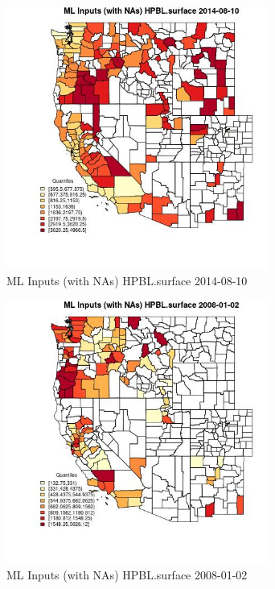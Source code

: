 \begin{figure} 
\centering  
\includegraphics[width=0.77\textwidth]{Code_Outputs/Report_ML_input_PM25_Step4_part_e_de_duplicated_aves_compiled_2019-05-18wNAs_CountyHPBLsurfaceMean2014-08-10_2014-08-10.jpg} 
\caption{\label{fig:Report_ML_input_PM25_Step4_part_e_de_duplicated_aves_compiled_2019-05-18wNAsCountyHPBLsurfaceMean2014-08-10_2014-08-10}ML Inputs (with NAs) HPBL.surface 2014-08-10} 
\end{figure} 
 

\begin{figure} 
\centering  
\includegraphics[width=0.77\textwidth]{Code_Outputs/Report_ML_input_PM25_Step4_part_e_de_duplicated_aves_compiled_2019-05-18wNAs_CountyHPBLsurfaceMean2008-01-02_2008-01-02.jpg} 
\caption{\label{fig:Report_ML_input_PM25_Step4_part_e_de_duplicated_aves_compiled_2019-05-18wNAsCountyHPBLsurfaceMean2008-01-02_2008-01-02}ML Inputs (with NAs) HPBL.surface 2008-01-02} 
\end{figure} 
 

